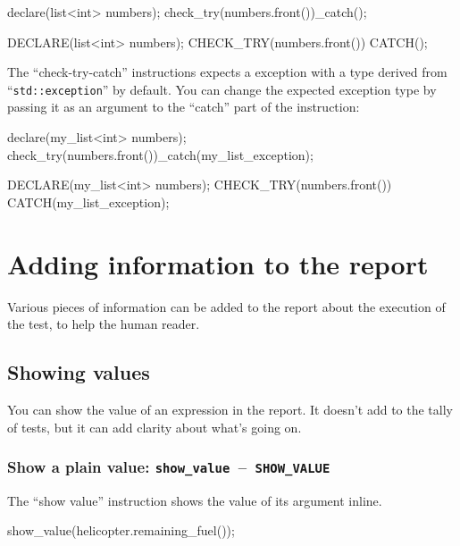 \documentclass[twoside, a4paper, article]{memoir}
\newcommand*\testudocolor{\color{red!80!blue}}
\newcommand*\testudo[1]{\texttt{\testudocolor{}#1}}
\newcommand*\testudopair[2]{\testudo{#1}~--~\testudo{#2}}
\begin{document}
\begin{cpplisting}
declare(list<int> numbers);
check_try(numbers.front())_catch();
\end{cpplisting}

\begin{cpplisting}
DECLARE(list<int> numbers);
CHECK_TRY(numbers.front()) CATCH();
\end{cpplisting}

The ``check-try-catch'' instructions expects a exception with a type derived
from ``\texttt{std::exception}'' by default.  You can change the expected
exception type by passing it as an argument to the ``catch'' part of the
instruction:
\begin{cpplisting}
declare(my_list<int> numbers);
check_try(numbers.front())_catch(my_list_exception);
\end{cpplisting}

\begin{cpplisting}
DECLARE(my_list<int> numbers);
CHECK_TRY(numbers.front()) CATCH(my_list_exception);
\end{cpplisting}


\section{Adding information to the report}
\label{sec:adding-information-report}

Various pieces of information can be added to the report about the execution of
the test, to help the human reader.

\subsection{Showing values}
\label{sec:showing-values}

You can show the value of an expression in the report.  It doesn't add to the
tally of tests, but it can add clarity about what's going on.

\subsubsection{Show a plain value:
  \testudopair{show\_value}{SHOW\_VALUE}}
\label{sec:show-plain-value}

The ``show value'' instruction shows the value of its argument inline.

\begin{cpplisting}
show_value(helicopter.remaining_fuel());
\end{cpplisting}
\end{document}
